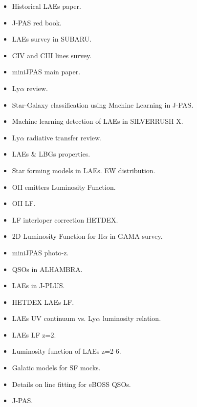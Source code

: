 \documentclass[a4paper,fleqn,usenatbib]{mnras}
\begin{document}
\begin{itemize}
    \item Historical LAEs paper. \cite{Partridge1967}
    \item J-PAS red book. \cite{benitez2014jpas}
    \item LAEs survey in SUBARU. \cite{ouchi2018}
    \item CIV and CIII lines survey. \cite{stroe2017}
    \item miniJPAS main paper. \cite{bonoli2020}
    \item Ly$\alpha$ review. \cite{ouchi2020}
    \item Star-Galaxy classification using Machine Learning in J-PAS. \cite{baqui2021}
    \item Machine learning detection of LAEs in SILVERRUSH X. \cite{ono2021}
    \item Ly$\alpha$ radiative transfer review. \cite{Dijkstra2019}
    \item LAEs \& LBGs properties. \cite{ArrabalHaro2020}
    \item Star forming models in LAEs. EW distribution. \cite{Charlot1993}
    \item OII emitters Luminosity Function. \cite{Ciardullo2013}
    \item OII LF. \cite{Gilbank2010}
    \item LF interloper correction HETDEX. \cite{Farrow2021}
    \item 2D Luminosity Function for H$\alpha$ in GAMA survey. \cite{Gunawardhana2002}
    \item miniJPAS photo-z. \cite{Hernan-Caballero2021}
    \item QSOs in ALHAMBRA. \cite{Matute2018}
    \item LAEs in J-PLUS. \cite{Spinoso2020}
    \item HETDEX LAEs LF. \cite{Zhang2021}
    \item LAEs UV continuum vs. Ly$\alpha$ luminosity relation. \cite{Santos2021}
    \item LAEs LF z=2. \cite{Konno2016}
    \item Luminosity function of LAEs z=2-6. \cite{Sobral2018}
    \item Galatic models for SF mocks. \cite{bruzual2003}
    \item Details on line fitting for eBOSS QSOs. \cite{bolton2012}
    \item J-PAS. \cite{Benitez2014}
\end{itemize}
\end{document}
